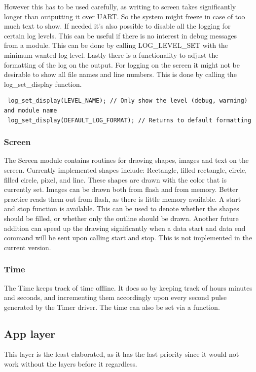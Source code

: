 However this has to be used carefully, as writing to screen takes significantly longer than outputting it over UART. So the system might freeze in case of too much text to show. If needed it's also possible to disable all the logging for certain log levels. This can be useful if there is no interest in debug messages from a module. This can be done by calling LOG\_LEVEL\_SET with the minimum wanted log level.
 Lastly there is a functionality to adjust the formatting of the log on the output. For logging on the screen it might not be desirable to show all file names and line numbers. This is done by calling the log\_set\_display function.
 \begin{verbatim}
 log_set_display(LEVEL_NAME); // Only show the level (debug, warning) and module name
 log_set_display(DEFAULT_LOG_FORMAT); // Returns to default formatting
 \end{verbatim}

\subsubsection{Screen}
The Screen module contains routines for drawing shapes, images and text on the screen. Currently implemented shapes include: Rectangle, filled rectangle, circle, filled circle, pixel, and line. These shapes are drawn with the color that is currently set. Images can be drawn both from flash and from memory. Better practice reads them out from flash, as there is little memory available. A start and stop function is available. This can be used to denote whether the shapes should be filled, or whether only the outline should be drawn. Another future addition can speed up the drawing significantly when a data start and data end command will be sent upon calling start and stop. This is not implemented in the current version.
\subsubsection{Time}
The Time keeps track of time offline. It does so by keeping track of hours minutes and seconds, and incrementing them accordingly upon every second pulse generated by the Timer driver. The time can also be set via a function.

\subsection{App layer}
This layer is the least elaborated, as it has the last priority since it would not work without the layers before it regardless.
